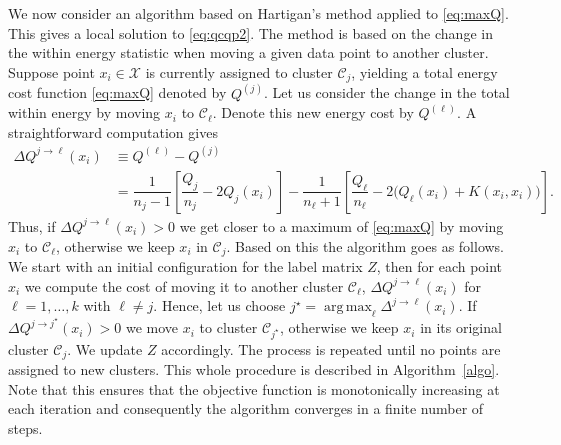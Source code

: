 \documentclass[aps,preprint,nofootinbib,floatfix]{revtex4-1}
\DeclareMathOperator*{\argmax}{arg\,max}
\newcommand\kk{K}
\newcommand\C{{\mathcal{C}}}
\begin{document}
We now consider an algorithm based on Hartigan's method \cite{Hartigan} 
applied to \eqref{eq:maxQ}. This gives a local solution to 
\eqref{eq:qcqp2}. 
The method is based on the change
in the within energy statistic when moving a given data point to
another cluster.
Suppose point $x_i \in \mathcal{X}$
is currently assigned to  cluster $\C_j$, yielding
a total energy cost function \eqref{eq:maxQ} denoted by $Q^{(j)}$.
Let us consider the change in the total within energy by moving
$x_i$ to $\C_\ell$. 
Denote this new energy cost by $Q^{(\ell)}$.
A straightforward computation gives
\begin{equation}
\label{eq:changeQ}
\begin{split}
\Delta Q^{j \to \ell}(x_i) &\equiv Q^{(\ell)} - Q^{(j)} \\ 
&= 
\dfrac{1}{n_j - 1}\left[ \dfrac{Q_j}{n_j} - 2 Q_j(x_i) \right]
- \dfrac{1}{n_\ell + 1}\left[ \dfrac{Q_\ell}{n_\ell} - 2 \big(Q_\ell(x_i) + 
\kk(x_i,x_i)\big) 
\right].
\end{split}
\end{equation}
Thus, if $\Delta Q^{j\to \ell}(x_i) > 0$ we get closer to a 
maximum of \eqref{eq:maxQ} by
moving $x_i$ to $\C_\ell$, otherwise we keep $x_i$ in $\C_j$. Based on
this the algorithm goes as follows.
We start with an initial configuration for the label matrix $Z$, 
then for each
point $x_i$ 
we compute the cost of moving it to another cluster $\C_\ell$,
$\Delta Q^{j\to \ell}(x_i)$ for 
$\ell=1,\dots,k$ with $\ell \ne j$. Hence, let us choose
$j^\star = \argmax_\ell \Delta^{j \to \ell}(x_i)$.
If $\Delta Q^{j \to j^\star}(x_i) > 0$ 
we move $x_i$ to cluster $\C_{j^\star}$, otherwise 
we keep $x_i$ in its original cluster $\C_j$. We update $Z$ accordingly.
The process is repeated
until no points are assigned to new clusters. 
This whole procedure is described in Algorithm~\ref{algo}.
Note that this ensures that the objective function is
monotonically increasing at each iteration and consequently the algorithm
converges in a finite number of steps.
\end{document}
